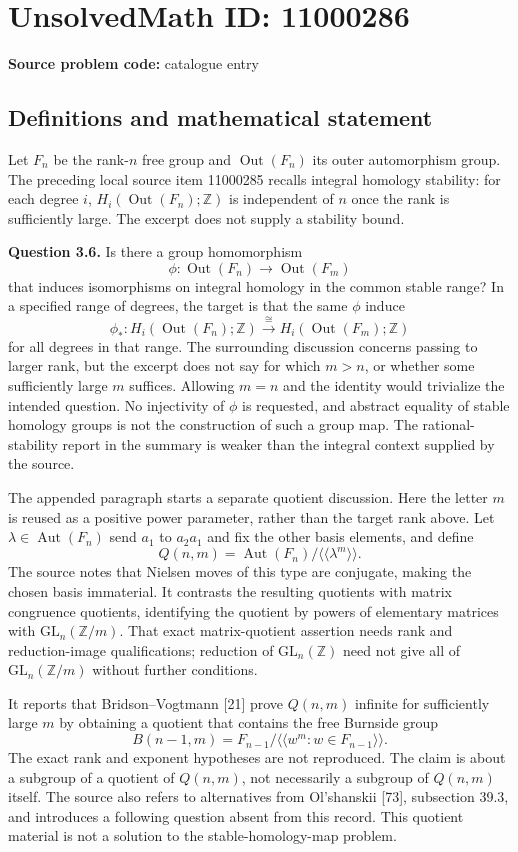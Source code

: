 \documentclass[11pt]{article}
\newcommand{\Z}{\mathbb{Z}}
\begin{document}
\section*{UnsolvedMath ID: 11000286}
\textbf{Source problem code:} catalogue entry
\subsection{Definitions and mathematical statement}
Let $F_n$ be the rank-$n$ free group and $\operatorname{Out}(F_n)$ its outer automorphism group. The preceding local source item 11000285 recalls integral homology stability: for each degree $i$, $H_i(\operatorname{Out}(F_n);\Z)$ is independent of $n$ once the rank is sufficiently large. The excerpt does not supply a stability bound.

\textbf{Question 3.6.} Is there a group homomorphism
\[
 \phi:\operatorname{Out}(F_n)\longrightarrow\operatorname{Out}(F_m)
\]
that induces isomorphisms on integral homology in the common stable range? In a specified range of degrees, the target is that the same $\phi$ induce
\[
 \phi_*:H_i(\operatorname{Out}(F_n);\Z)\xrightarrow{\cong}
 H_i(\operatorname{Out}(F_m);\Z)
\]
for all degrees in that range. The surrounding discussion concerns passing to larger rank, but the excerpt does not say for which $m>n$, or whether some sufficiently large $m$ suffices. Allowing $m=n$ and the identity would trivialize the intended question. No injectivity of $\phi$ is requested, and abstract equality of stable homology groups is not the construction of such a group map. The rational-stability report in the summary is weaker than the integral context supplied by the source.

The appended paragraph starts a separate quotient discussion. Here the letter $m$ is reused as a positive power parameter, rather than the target rank above. Let $\lambda\in\operatorname{Aut}(F_n)$ send $a_1$ to $a_2a_1$ and fix the other basis elements, and define
\[
 Q(n,m)=\operatorname{Aut}(F_n)/\langle\!\langle\lambda^m\rangle\!\rangle.
\]
The source notes that Nielsen moves of this type are conjugate, making the chosen basis immaterial. It contrasts the resulting quotients with matrix congruence quotients, identifying the quotient by powers of elementary matrices with $\mathrm{GL}_n(\Z/m)$. That exact matrix-quotient assertion needs rank and reduction-image qualifications; reduction of $\mathrm{GL}_n(\Z)$ need not give all of $\mathrm{GL}_n(\Z/m)$ without further conditions.

It reports that Bridson--Vogtmann [21] prove $Q(n,m)$ infinite for sufficiently large $m$ by obtaining a quotient that contains the free Burnside group
\[
 B(n-1,m)=F_{n-1}/\langle\!\langle w^m:w\in F_{n-1}\rangle\!\rangle.
\]
The exact rank and exponent hypotheses are not reproduced. The claim is about a subgroup of a quotient of $Q(n,m)$, not necessarily a subgroup of $Q(n,m)$ itself. The source also refers to alternatives from Ol'shanskii [73], subsection 39.3, and introduces a following question absent from this record. This quotient material is not a solution to the stable-homology-map problem.
\end{document}
